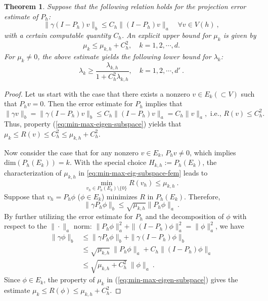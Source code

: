 \documentclass[a4,11pt]{article}
\numberwithin{equation}{section}
\newtheorem{theorem}{Theorem}[section]
\begin{document}
\begin{theorem}\label{thm:eigenvalue-explicit-bound} 
Suppose that the following relation holds for the projection error estimate of $P_h$:
\begin{equation}
\label{eq:projection-error-est}
  \|\gamma (I-P_h)v\|_b \le C_h \|(I-P_h)v\|_a \quad \forall v \in V(h)\:,
\end{equation}
with a certain computable quantity $C_h$. 
An explicit upper bound for $\mu_{k}$ is given by
\begin{equation}
  \label{eq:mu-upper-bound}
\mu_{k}\leq \mu_{k, h}+C_h^{2} , \quad k=1,2, \cdots, d.
\end{equation}
For $\mu_k\neq 0$, the above estimate yields the following lower bound for $\lambda_k$:
\begin{equation}
  \label{eq:lambda-lower-bound}
  \lambda_{k}\geq \frac{\lambda_{k, h}}{1+ C_h^{2} \lambda_{k,h}}, \quad k=1,2,\cdots, {d'}\:.
\end{equation}
\end{theorem}
\begin{proof}
Let us start with the case that there exists a nonzero $v\in E_{k}(\subset V)$ such that $P_h v=0$. Then the error estimate for $P_h$ implies that 
$$
\|\gamma v \|_b = \|\gamma (I-P_h)v \|_b \le C_h \|(I-P_h)v \|_a = C_h \|v \|_a, \mbox{ i.e., } R(v) \le C_h^2.
$$
Thus, property (\ref{eq:min-max-eigen-subspace}) yields that $\mu_k \le  R(v) \le C_h^2\le \mu_{k,h}+C_h^2$. 

\medskip

Now  consider the case that for any nonzero $v\in E_k$, $P_hv\neq 0$, which implies $\mbox{dim}(P_h(E_k))=k$. 
With the special choice $H_{k,h}:=P_h(E_k)$, the characterization of $\mu_{k,h}$  in \eqref{eq:min-max-eig-subspace-fem} leads to
$$
 \min_{v_h \in P_h (E_k)\setminus\{0\}} R(v_h) \le \mu_{k,h}\:.
$$
Suppose that $v_h=P_h \phi$ ($\phi \in E_k$)  minimizes $R$ in $P_h (E_k)$.  Therefore, 
$$
\|\gamma P_h \phi \|_b \le  \sqrt{\mu_{k,h}} \|P_h \phi \|_a\:.
 $$
 By further utilizing the error estimate for $P_h$ and the decomposition of $\phi$ with respect to the $\|\cdot\|_a$ norm: $\|P_h \phi \|_a^2+\|(I-P_h)\phi\|_a^2=\|\phi\|_a^2$, we have 
 \begin{align*}
 \|\gamma  \phi\|_b 
 & \le  \|\gamma  P_h \phi\|_b + \|\gamma (I-P_h)\phi \|_b  \\
 & \le \sqrt{ \mu_{k,h}} ~ \|P_h \phi\|_a + C_h \|(I-P_h)\phi\|_a \\
 & \le \sqrt{\mu_{k,h}+C_h^2}~  \|\phi\|_a\:.
 \end{align*}
 Since $\phi \in E_k$, {the property of $\mu_k$ in  (\ref{eq:min-max-eigen-subspace})} gives the estimate $\mu_k \le R(\phi) \le \mu_{k,h}+C_h^2$.  

\quad
\end{proof}
\end{document}
